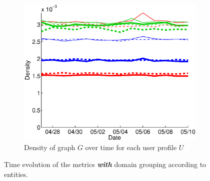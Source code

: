 \documentclass{sig-alternate}
\begin{document}
\begin{figure}
  \begin{subfigure}{.45\textwidth}
    \includegraphics[width=\textwidth]{figures/plots/density-entities.eps}
    \caption{Density of graph $G$ over time for each user profile $U$}
    \label{fig:density_entities}
  \end{subfigure}
  \caption{Time evolution of the metrics \textbf{\textit{with}} domain grouping according to entities.}
  \label{fig:metrics_with_entities}
  \end{figure}
\end{document}
